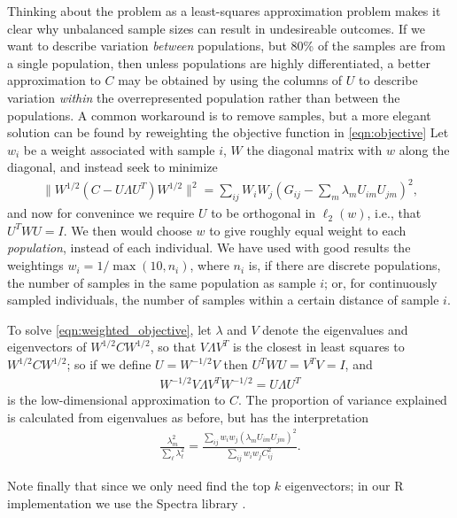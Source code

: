 \documentclass[11pt, oneside]{article}   	%
\begin{document}
Thinking about the problem as a least-squares approximation problem
makes it clear why unbalanced sample sizes can result in undesireable outcomes.
If we want to describe variation \emph{between} populations,
but 80\% of the samples are from a single population,
then unless populations are highly differentiated, 
a better approximation to $C$ may be obtained by using the columns of $U$ to describe variation \emph{within} the overrepresented population
rather than between the populations.
A common workaround is to remove samples,
but a more elegant solution can be found by reweighting the objective function in \eqref{eqn:objective}
Let $w_{i}$ be a weight associated with sample $i$,
$W$ the diagonal matrix with $w$ along the diagonal,
and instead seek to minimize
\begin{align} \label{eqn:weighted_objective}
    \| W^{1/2} (C - U \Lambda U^T) W^{1/2} \|^2 = \sum_{ij} W_i W_j \left( G_{ij} - \sum_m \lambda_{m} U_{im} U_{jm} \right)^2 ,
\end{align}
and now for convenince we require $U$ to be orthogonal in $\ell_2(w)$, i.e., that $U^T W U =I$.
We then would choose $w$ to give roughly equal weight to each \emph{population},
instead of each individual.
We have used with good results the weightings
$w_i = 1/\max(10,n_i)$,
where $n_i$ is, if there are discrete populations,
the number of samples in the same population as sample $i$;
or, for continuously sampled individuals,
the number of samples within a certain distance of sample $i$.

To solve \eqref{eqn:weighted_objective},
let $\lambda$ and $V$ denote the eigenvalues and eigenvectors of $W^{1/2} C W^{1/2}$,
so that $V \Lambda V^T$ is the closest in least squares to $W^{1/2} C W^{1/2}$;
so if we define $U = W^{-1/2} V$
then $U^T W U = V^T V = I$,
and 
\begin{align*}
    W^{-1/2} V \Lambda V^T W^{-1/2} 
    =
    U \Lambda U^T
\end{align*}
is the low-dimensional approximation to $C$.
The proportion of variance explained is calculated from eigenvalues as before,
but has the interpretation
\begin{align*}
    \frac{ \lambda_m^2 }{ \sum_\ell \lambda_\ell^2 } 
    = 
    \frac{ \sum_{ij} w_i w_j ( \lambda_m U_{im} U_{jm} )^2 }{ \sum_{ij} w_i w_j C_{ij}^2 } .
\end{align*}

Note finally that since we only need find the top $k$ eigenvectors;
in our R implementation we use the Spectra library \citep{qiu2016rspectra}.
\end{document}
